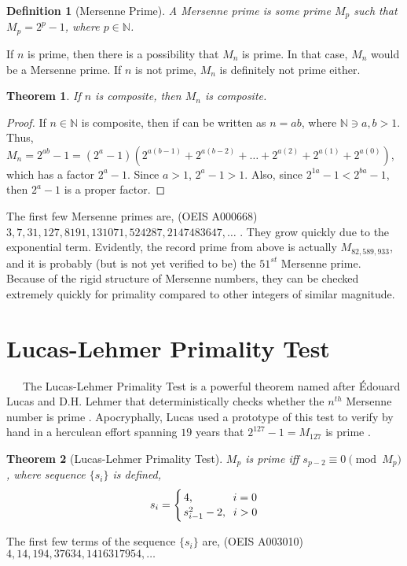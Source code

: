 \documentclass[10pt, oneside]{article}
\newcommand{\stack}[2]{\genfrac{}{}{0pt}{}{#1}{#2}}
\newcommand{\N}{\mathbb{N}}
\newcommand{\entab}{\,\,\,\,\,\,\,\,\,}
\newtheorem{thm}{Theorem}
\newtheorem{defn}{Definition}
\begin{document}
\begin{defn}[Mersenne Prime] 
A Mersenne prime is some prime $M_p$ such that $M_p = 2^p  - 1$, where $p \in \N$. 
\end{defn}

If $n$ is prime, then there is a possibility that $M_n$ is prime. In that case, $M_n$ would be a Mersenne prime. If $n$ is not prime, $M_n$ is definitely not prime either.

\begin{thm}
    If $n$ is composite, then $M_n$ is composite.
\end{thm}
\begin{proof}
    If $n \in \N$ is composite, then if can be written as $n = ab$, where $\N \ni a,b > 1$. Thus, $M_n = 2^{ab} - 1 = (2^a - 1)(2^{a(b-1)} + 2^{a(b-2)} + \hdots + 2^{a(2)} + 2 ^{a(1)} + 2^{a(0)})$, which has a factor $2^a - 1$. Since $a > 1$, $2^a - 1 > 1$. Also, since $2^{1a} - 1 < 2^{ba} - 1$, then $2^a - 1$ is a proper factor.
\end{proof}

The first few Mersenne primes are, (OEIS A000668) $3, 7, 31, 127, 8191, 131071, 524287, 2147483647, \hdots$ \cite{OEIS668}. They grow quickly due to the exponential term. Evidently, the record prime from above is actually $M_{82,589,933}$, and it is probably (but is not yet verified to be) the $51^{st}$ Mersenne prime. Because of the rigid structure of Mersenne numbers, they can be checked extremely quickly for primality compared to other integers of similar magnitude.


\section{Lucas-Lehmer Primality Test}
\entab The Lucas-Lehmer Primality Test is a powerful theorem named after \'{E}douard Lucas and D.H. Lehmer that deterministically checks whether the $n^{th}$ Mersenne number is prime \cite{LL}. Apocryphally, Lucas used a prototype of this test to verify by hand in a herculean effort spanning $19$ years that $2^{127} - 1 = M_{127}$ is prime \cite{Lucas}. 

\begin{thm}[Lucas-Lehmer Primality Test]
$M_p$ is prime iff $s_{p-2} \equiv 0 \pmod {M_p}$, where sequence $\{s_i\}$ is defined,
    \[s_i = \Bigg\{ \stack{4, \quad\quad\quad\;\; i = 0}{s_{i-1}^2 - 2, \;\; i > 0}\]
\end{thm}

The first few terms of the sequence $\{s_i\}$ are, (OEIS A003010) $4, 14, 194, 37634, 1416317954, \hdots$ \cite{OEIS3010}
\end{document}
